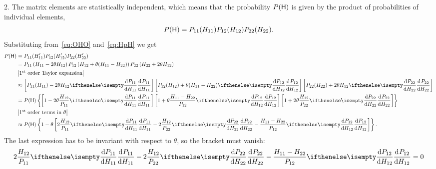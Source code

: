 \documentclass[a4paper,11pt,twoside]{article}
\begin{document}
            2. The matrix elements are statistically independent, which means that the probability $P(\mathsf{H})$ is given by the product of probabilities of individual elements, 
            \begin{equation}
                P(\mathsf{H})
                    =P_{11}(H_{11})P_{12}(H_{12})P_{22}(H_{22}).
            \end{equation}
            Substituting from~\eqref{eq:OHO} and~\eqref{eq:HpH} we get 
            \begin{align}
                P(\matrix{H})
                    &=P_{11}(H'_{11})P_{12}(H'_{12})P_{22}(H'_{22})\nonumber\\
                    &=P_{11}\left(H_{11}-2\theta H_{12}\right)
                        P_{12}\left(H_{12}+\theta(H_{11}-H_{22})\right)
                        P_{22}\left(H_{22}+2\theta H_{12}\right)\nonumber\\
                    &\equationcomment{\text{$1^{\text{st}}$ order Taylor expansion}}\nonumber\\
                    &\approx \left[P_{11}(H_{11})-2\theta H_{12}\derivative{P_{11}}{H_{11}}\right]
                        \left[P_{12}(H_{12})+\theta(H_{11}-H_{22})\derivative{P_{12}}{H_{12}}\right]
                        \left[P_{22}(H_{22})+2\theta H_{12}\derivative{P_{22}}{H_{22}}\right]\nonumber\\
                    &=P(\matrix{H})\left\{
                        \left[1-2\theta\frac{H_{12}}{P_{11}}\derivative{P_{11}}{H_{11}}\right]
                        \left[1+\theta\frac{H_{11}-H_{22}}{P_{12}}\derivative{P_{12}}{H_{12}}\right]
                        \left[1+2\theta\frac{H_{12}}{P_{22}}\derivative{P_{22}}{H_{22}}\right]
                        \right\}\nonumber\\
                    &\equationcomment{\text{$1^{\text{st}}$ order terms in $\theta$}}\nonumber\\
                    &\approx P(\matrix{H})\left\{1-\theta\left[
                        2\frac{H_{12}}{P_{11}}\derivative{P_{11}}{H_{11}}
                        -2\frac{H_{12}}{P_{22}}\derivative{P_{22}}{H_{22}}
                        -\frac{H_{11}-H_{22}}{P_{12}}\derivative{P_{12}}{H_{12}}
                        \right]\right\}.
            \end{align}
            The last expression has to be invariant with respect to $\theta$, so the bracket must vanish:
            \begin{equation}
                2\frac{H_{12}}{P_{11}}\derivative{P_{11}}{H_{11}}
                -2\frac{H_{12}}{P_{22}}\derivative{P_{22}}{H_{22}}
                -\frac{H_{11}-H_{22}}{P_{12}}\derivative{P_{12}}{H_{12}}=0
            \end{equation}
\end{document}

